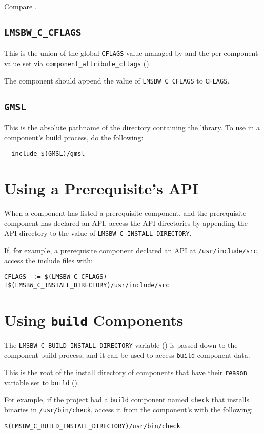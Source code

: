 Compare .

\subsection{\texttt{LMSBW\_C\_CFLAGS}}

This is the union of the global \texttt{CFLAGS} value managed by
\lmsbw and the per-component value set via
\texttt{\texttt{component\_attribute\_cflags}} ().

The component \makefile should append the value of
\texttt{LMSBW\_C\_CFLAGS} to \texttt{CFLAGS}.

\subsection{\texttt{GMSL}}

This is the absolute pathname of the directory containing the \gmsl
library.  To use \gmsl in a component's build process, do the
following:

\begin{verbatim}
  include $(GMSL)/gmsl
\end{verbatim}

\section{Using a Prerequisite's API}\label{wrap:using-prerequisite-api}

When a component has listed a prerequisite component, and the
prerequisite component has declared an API, access the API directories
by appending the API directory to the value of
\texttt{LMSBW\_C\_INSTALL\_DIRECTORY}.

If, for example, a prerequisite component declared an API at
\texttt{/usr/include/src}, access the include files with:

\begin{verbatim}
CFLAGS  := $(LMSBW_C_CFLAGS) -I$(LMSBW_C_INSTALL_DIRECTORY)/usr/include/src
\end{verbatim}

\section{Using \texttt{build} Components}\label{wrap:using-build-components}

The \texttt{LMSBW\_C\_BUILD\_INSTALL\_DIRECTORY} variable
() is passed down to the component
build process, and it can be used to access \texttt{build} component
data.

This is the root of the install directory of components that have
their \texttt{reason} variable set to \texttt{build}
().

For example, if the project had a \texttt{build} component named
\texttt{check} that installs binaries in \texttt{/usr/bin/check},
access it from the component's \makefile with the following:

\begin{verbatim}
$(LMSBW_C_BUILD_INSTALL_DIRECTORY)/usr/bin/check
\end{verbatim}
